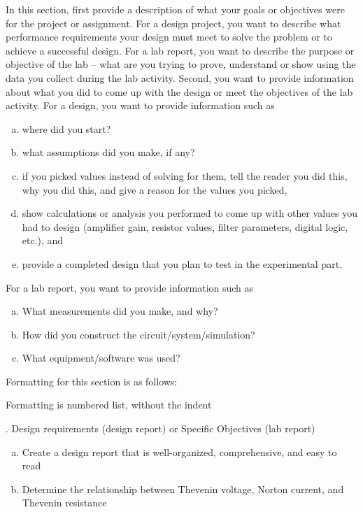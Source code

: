 \documentclass[11pt]{ECEtemp}
\begin{document}
In this section, first provide a description of what your goals or objectives were for the project or assignment. For a design project, you want to describe what performance requirements your design must meet to solve the problem or to achieve a successful design. For a lab report, you want to describe the purpose or objective of the lab – what are you trying to prove, understand or show using the data you collect during the lab activity. 
Second, you want to provide information about what you did to come up with the design or meet the objectives of the lab activity. 
For a design, you want to provide information such as 
\begin{enumerate}[(a)]
\item where did you start? 
\item what assumptions did you make, if any? 
\item if you picked values instead of solving for them, tell the reader you did this, why you did this, and give a reason for the values you picked, 
\item show calculations or analysis you performed to come up with other values you had to design (amplifier gain, resistor values, filter parameters, digital logic, etc.), and 
\item  provide a completed design that you plan to test in the experimental part.
\end{enumerate}


For a lab report, you want to provide information such as
\begin{enumerate}[(a)]
\item What measurements did you make, and why?
\item How did you construct the circuit/system/simulation?
\item What equipment/software was used?
\end{enumerate}

\noindent
Formatting for this section is as follows:


\noindent
Formatting is numbered list, without the indent

. Design requirements (design report) or Specific Objectives (lab report)

\begin{enumerate}[(a)]
\item	Create a design report that is well-organized, comprehensive, and easy to read
\item	Determine the relationship between Thevenin voltage, Norton current, and Thevenin resistance
\end{enumerate}
\end{document}

